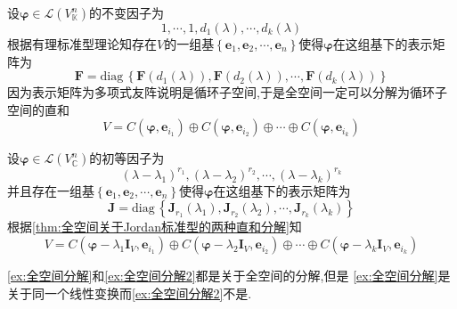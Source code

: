 \begin{brown}
    \begin{example}\label{ex:全空间分解}
        设$\bm{\varphi}\in\mathcal{L}\left(
            V_{\mathbb{K}}^n
        \right)$的不变因子为\[
        1,\cdots,1,d_1\left(\lambda\right),\cdots,d_k\left(\lambda\right)
        \]根据有理标准型理论知存在$V$的一组基$\left\{
            \bm{e}_1,\bm{e}_2,\cdots,\bm{e}_n
        \right\}$使得$\bm{\varphi}$在这组基下的表示矩阵为\[
        \bm{F}= \mathrm{diag}\,\left\{
            \bm{F}\left(d_1\left(\lambda\right)\right),\bm{F}\left(d_2\left(\lambda\right)\right),\cdots,\bm{F}\left(d_k\left(\lambda\right)\right)
        \right\}
        \]因为表示矩阵为多项式友阵说明是循环子空间,于是全空间一定可以分解为循环子空间的直和\[
    V=C\left(
        \bm{\varphi},\bm{e}_{i_1}
     \right)\oplus C\left(
        \bm{\varphi},\bm{e}_{i_2}
        \right)\oplus\cdots\oplus C\left(
            \bm{\varphi},\bm{e}_{i_k}
        \right)
        \]
    \end{example}
\end{brown}
\begin{brown}
    \begin{example}\label{ex:全空间分解2}
        设$\bm{\varphi}\in\mathcal{L}\left(
            V_{\mathbb{C}}^n
        \right)$的初等因子为\[
        \left(\lambda-\lambda_1\right)^{r_1},\left(\lambda-\lambda_2\right)^{r_2},\cdots,\left(\lambda-\lambda_k\right)^{r_k}
        \]并且存在一组基$\left\{
            \bm{e}_1,\bm{e}_2,\cdots,\bm{e}_n
        \right\}$使得$\bm{\varphi}$在这组基下的表示矩阵为\[
        \bm{J}= \mathrm{diag}\,\left\{
            \bm{J}_{r_1}\left(\lambda_1\right),\bm{J}_{r_2}\left(\lambda_2\right),\cdots,\bm{J}_{r_k}\left(\lambda_k\right)
        \right\}
        \]根据\cref{thm:全空间关于Jordan标准型的两种直和分解}知\[
        V=C\left(
            \bm{\varphi}-\lambda_1\bm{I}_V,\bm{e}_{i_1}
        \right)\oplus C\left(
            \bm{\varphi}-\lambda_2\bm{I}_V,\bm{e}_{i_2}
        \right)\oplus\cdots\oplus C\left(
            \bm{\varphi}-\lambda_k\bm{I}_V,\bm{e}_{i_k}
        \right)
        \]
    \end{example}
\end{brown}
\begin{red}
    \begin{remark}
        \cref{ex:全空间分解}和\cref{ex:全空间分解2}都是关于全空间的分解,但是
        \cref{ex:全空间分解}是关于同一个线性变换而\cref{ex:全空间分解2}不是.
    \end{remark}
\end{red}
